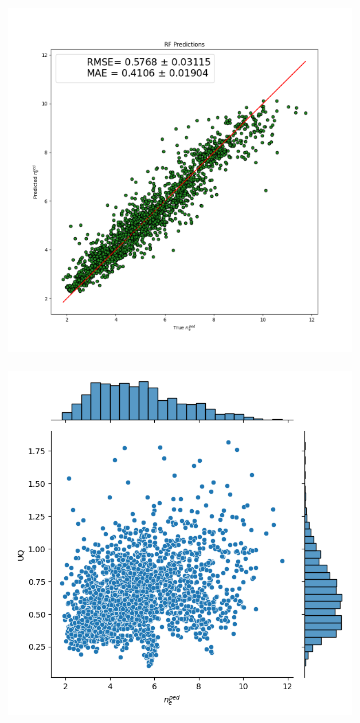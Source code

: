 \documentclass[a4paper, twoside, final, 12pt]{article}
\begin{document}
{\begin{figure}
	\begin{subfigure}{0.33\linewidth}
		\centering
		\includegraphics[scale=0.2]{./src/RF_predictions_and_uncert}
		\caption{}
		\label{subfig:RF_UQ}
	\end{subfigure}
	\begin{subfigure}{0.33\linewidth}
		\centering
		\includegraphics[scale=0.3]{./src/RF_UQ}

\end{subfigure}
\end{figure}}
\end{document}
